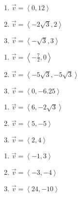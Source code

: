 \documentclass{ximera}
\begin{document}
 

 

\begin{enumerate}

\setcounter{enumi}{\value{HW}}

\item $\overrightarrow{v} = \left<0,12\right>$
\item $\overrightarrow{v} = \left<-2\sqrt{3}, 2\right>$
\item $\overrightarrow{v} = \left<-\sqrt{3}, 3\right>$

\setcounter{HW}{\value{enumi}}

\end{enumerate}

 

 

\begin{enumerate}

\setcounter{enumi}{\value{HW}}

\item $\overrightarrow{v} = \left<-\frac{7}{2}, 0\right>$
\item $\overrightarrow{v} = \left<-5\sqrt{3}, -5\sqrt{3}\right>$
\item $\overrightarrow{v} = \left<0, -6.25\right>$

\setcounter{HW}{\value{enumi}}

\end{enumerate}

 

 

\begin{enumerate}

\setcounter{enumi}{\value{HW}}

\item $\overrightarrow{v} = \left<6, -2\sqrt{3}\right>$
\item $\overrightarrow{v} = \left<5, -5\right>$
\item $\overrightarrow{v} = \left<2,4\right>$

\setcounter{HW}{\value{enumi}}

\end{enumerate}

 

 

\begin{enumerate}

\setcounter{enumi}{\value{HW}}

\item $\overrightarrow{v} = \left<-1, 3\right>$
\item $\overrightarrow{v} = \left<-3, -4\right>$
\item $\overrightarrow{v} = \left<24, -10\right>$

\setcounter{HW}{\value{enumi}}

\end{enumerate}
\end{document}
